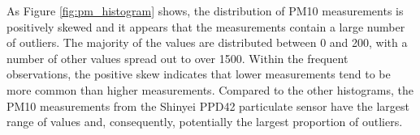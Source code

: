 \documentclass[11pt]{report}
\begin{document}

As Figure \ref{fig:pm_histogram} shows, the distribution of PM10 measurements is positively skewed and it appears that the measurements contain a large number of outliers. The majority of the values are distributed between 0 and 200, with a number of other values spread out to over \num{1500}. Within the frequent observations, the positive skew indicates that lower measurements tend to be more common than higher measurements. Compared to the other histograms, the PM10 measurements from the Shinyei PPD42 particulate sensor have the largest range of values and, consequently, potentially the largest proportion of outliers.
\end{document}
